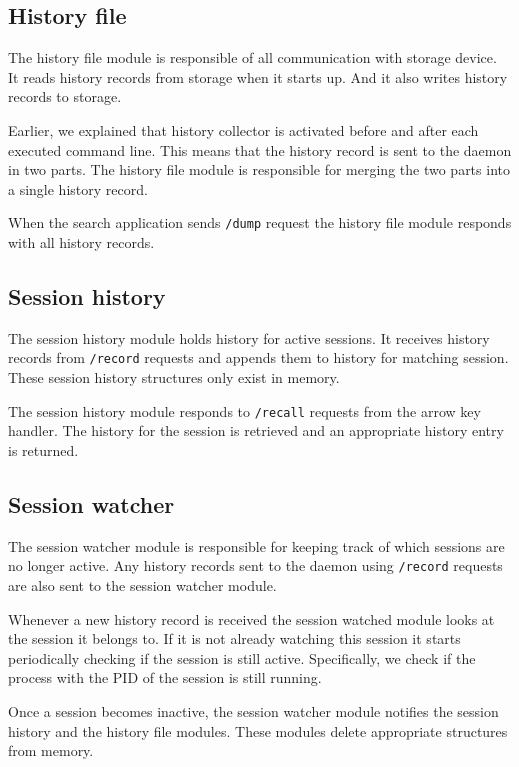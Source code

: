 \documentclass[thesis=M,english]{FITthesis}[2012/10/20]
\begin{document}
\subsection{History file}

The history file module is responsible of all communication with storage device. It reads history records from storage when it starts up. And it also writes history records to storage.

Earlier, we explained that history collector is activated before and after each executed command line. This means that the history record is sent to the daemon in two parts. The history file module is responsible for merging the two parts into a single history record. 

When the search application sends \verb|/dump| request the history file module responds with all history records. 


\subsection{Session history}

The session history module holds history for active sessions. It receives history records from \verb|/record| requests and appends them to history for matching session.
These session history structures only exist in memory.

The session history module responds to \verb|/recall| requests from the arrow key handler. The history for the session is retrieved and an appropriate history entry is returned. 

\subsection{Session watcher}

The session watcher module is responsible for keeping track of which sessions are no longer active. Any history records sent to the daemon using \verb|/record| requests are also sent to the session watcher module. 

Whenever a new history record is received the session watched module looks at the session it belongs to. If it is not already watching this session it starts periodically checking if the session is still active. Specifically, we check if the process with the PID of the session is still running.

Once a session becomes inactive, the session watcher module notifies the session history and the history file modules. These modules delete appropriate structures from memory.
\end{document}
